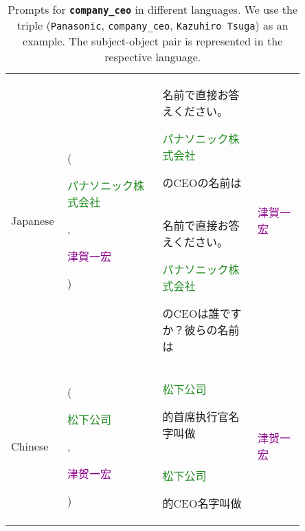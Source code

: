 \begin{table*}[htbp]
\begin{center}
\begin{tabular}{m{0.10\linewidth} p{0.30\linewidth} p{0.30\linewidth} m{0.15\linewidth}}
\midrule
\multirow{2}{*}{\centering Japanese} & \multirow{2}{*}{(\raggedright \textcolor{forestgreen}{\begin{CJK}{UTF8}{min}パナソニック株式会社\end{CJK}}, \textcolor{darkmagenta}{\begin{CJK}{UTF8}{min}津賀一宏\end{CJK}})} & 
\begin{CJK}{UTF8}{min}名前で直接お答えください。\end{CJK} \textcolor{forestgreen}{\begin{CJK}{UTF8}{min}パナソニック株式会社\end{CJK}} \begin{CJK}{UTF8}{min}のCEOの名前は\end{CJK} & \multirow{2}{*}{\centering
\textcolor{darkmagenta}{\begin{CJK}{UTF8}{min}津賀一宏\end{CJK}}} \\
& & \begin{CJK}{UTF8}{min}名前で直接お答えください。\end{CJK} \textcolor{forestgreen}{\begin{CJK}{UTF8}{min}パナソニック株式会社\end{CJK}} \begin{CJK}{UTF8}{min}のCEOは誰ですか？彼らの名前は\end{CJK} & \\
\midrule
\multirow{2}{*}{\centering Chinese} & \multirow{2}{*}{(\raggedright \textcolor{forestgreen}{\begin{CJK}{UTF8}{gbsn}松下公司\end{CJK}}, \textcolor{darkmagenta}{\begin{CJK}{UTF8}{gbsn}津贺一宏\end{CJK}})} & 
\textcolor{forestgreen}{\begin{CJK}{UTF8}{gbsn}松下公司\end{CJK}} \begin{CJK}{UTF8}{gbsn}的首席执行官名字叫做\end{CJK} & \multirow{2}{*}{\centering
\textcolor{darkmagenta}{\begin{CJK}{UTF8}{gbsn}津贺一宏\end{CJK}}} \\
& & \textcolor{forestgreen}{\begin{CJK}{UTF8}{gbsn}松下公司\end{CJK}} \begin{CJK}{UTF8}{gbsn}的CEO名字叫做\end{CJK} & \\
\bottomrule
\end{tabular}
\end{center}
\caption{Prompts for \textbf{\texttt{company\_ceo}} in different languages. We use the triple (\texttt{Panasonic}, \texttt{company\_ceo}, \texttt{Kazuhiro Tsuga}) as an example. The subject-object pair is represented in the respective language.}
\label{tab:prompts company_ceo}
\end{table*}

